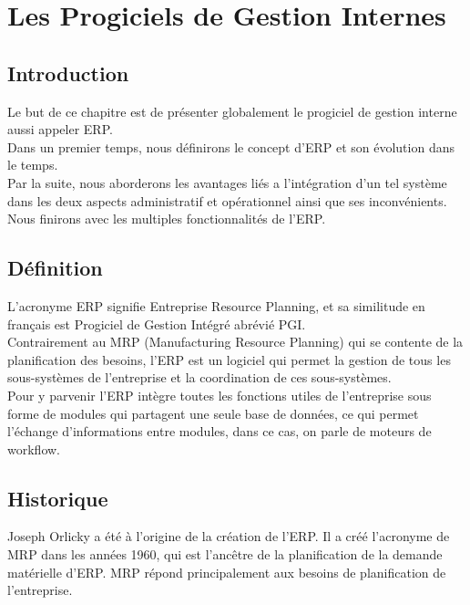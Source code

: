 \chapter{Les Progiciels de Gestion Internes}

\section{Introduction}
Le but de ce chapitre est de présenter globalement le progiciel de gestion interne aussi appeler \acs{ERP}.\\

Dans un premier temps, nous définirons le concept d'\acs{ERP} et son évolution dans le temps.\\

Par la suite, nous aborderons les avantages liés a l'intégration d'un tel système dans les deux aspects administratif et opérationnel ainsi que ses inconvénients.\\

Nous finirons avec les multiples fonctionnalités de l'\acs{ERP}.\\

\section{Définition}
L'acronyme \acs{ERP} signifie Entreprise Resource Planning, et sa similitude en français est Progiciel de Gestion Intégré abrévié \acs{PGI}.\\

Contrairement au \acs{MRP} (Manufacturing Resource Planning) qui se contente de la planification des besoins, l'\acs{ERP} est un logiciel qui permet la gestion de tous les sous-systèmes de l'entreprise et la coordination de ces sous-systèmes.\\

Pour y parvenir l’\acs{ERP} intègre toutes les fonctions utiles de l'entreprise sous forme de modules qui partagent une seule base de données, ce qui permet l'échange d'informations entre modules, dans ce cas, on parle de moteurs de workflow.\\

\section{Historique}
Joseph Orlicky a été à l'origine de la création de l'\acs{ERP}. Il a créé l'acronyme de \acs{MRP} dans les années 1960, qui est l'ancêtre de la planification de la demande matérielle d'\acs{ERP}. \acs{MRP} répond principalement aux besoins de planification de l'entreprise.\\

